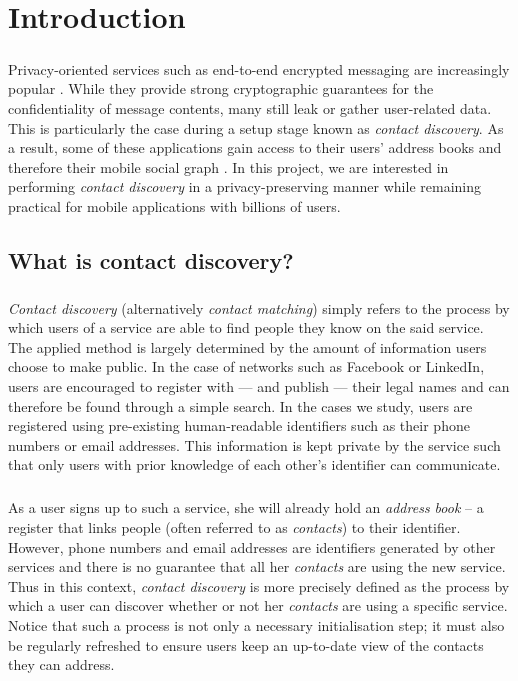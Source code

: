\chapter{Introduction}
\label{chap:intro}


\paragraph{} Privacy-oriented services such as end-to-end encrypted messaging are increasingly popular \cite{e2epopular}. While they provide strong cryptographic guarantees for the confidentiality of message contents, many still leak or gather user-related data. This is particularly the case during a setup stage known as \textit{contact discovery}. As a result, some of these applications gain access to their users' address books and therefore their mobile social graph \cite{Telegram,WhatsApp}. In this project, we are interested in performing \textit{contact discovery} in a privacy-preserving manner while remaining practical for mobile applications with billions of users.

\section{What is contact discovery?}

\paragraph{} \textit{Contact discovery} (alternatively \textit{contact matching}) simply refers to the process by which users of a service are able to find people they know on the said service. The applied method is largely determined by the amount of information users choose to make public. In the case of networks such as Facebook or LinkedIn, users are encouraged to register with --- and publish --- their legal names and can therefore be found through a simple search. In the cases we study, users are registered using pre-existing human-readable identifiers such as their phone numbers or email addresses. This information is kept private by the service such that only users with prior knowledge of each other's identifier can communicate.

\paragraph{} As a user signs up to such a service, she will already hold an \textit{address book} -- a register that links people (often referred to as \textit{contacts}) to their identifier. However, phone numbers and email addresses are identifiers generated by other services and there is no guarantee that all her \textit{contacts} are using the new service. Thus in this context, \textit{contact discovery} is more precisely defined as the process by which a user can discover whether or not her \textit{contacts} are using a specific service. Notice that such a process is not only a necessary initialisation step; it must also be regularly refreshed to ensure users keep an up-to-date view of the contacts they can address.


